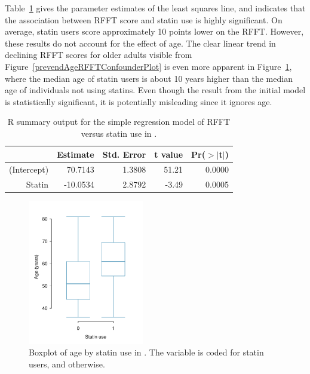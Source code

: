 Table~\ref{prevendRFFTStatinRegression} gives the parameter estimates of the least squares line, and indicates that the association between RFFT score and statin use is highly significant. On average, statin users score approximately 10 points lower on the RFFT. However, these results do not account for the effect of age. The clear linear trend in declining RFFT scores for older adults visible from Figure~\ref{prevendAgeRFFTConfounderPlot} is even more apparent in Figure~\ref{prevendStatinAgeBoxPlot}, where the median age of statin users is about 10 years higher than the median age of individuals not using statins. Even though the result from the initial model is statistically significant, it is potentially misleading since it ignores age.

\begin{table}[ht]
\centering
\begin{tabular}{rrrrr}
  \hline
 & Estimate & Std. Error & t value & Pr($>$$|$t$|$) \\ 
  \hline
(Intercept) & 70.7143 & 1.3808 & 51.21 & 0.0000 \\ 
  Statin & -10.0534 & 2.8792 & -3.49 & 0.0005 \\ 
   \hline
\end{tabular}
\caption{\textsf{R} summary output for the simple regression model of RFFT versus statin use in .} 
\label{prevendRFFTStatinRegression}
\end{table}

 \begin{figure}[h]
 	\centering
 	\includegraphics[width=0.45\textwidth]
 	{ch_multiple_linear_regression_oi_biostat/figures/prevendStatinAgeBoxPlot/prevendStatinAgeBoxPlot.pdf}
 	\caption{Boxplot of age by statin use in . The variable  is coded  for statin users, and  otherwise.}
 	\label{prevendStatinAgeBoxPlot}
 \end{figure}


